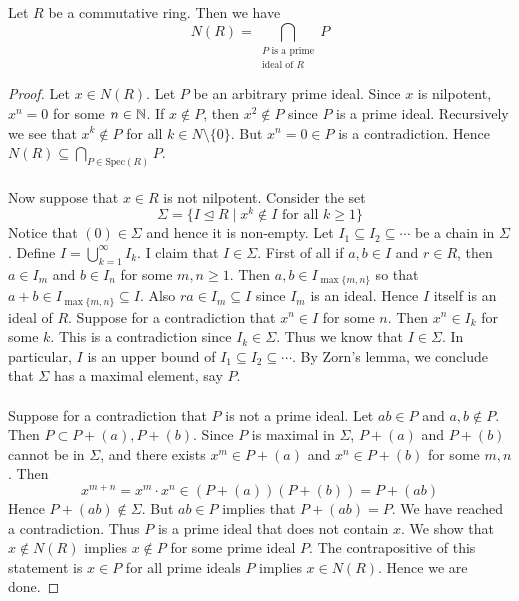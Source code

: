 \documentclass[a4paper]{article}
\begin{document}
\begin{prp}{}{} Let $R$ be a commutative ring. Then we have $$N(R)=\bigcap_{\substack{P\text{ is a prime}\\\text{ideal of }R}}P$$ \tcbline
\begin{proof}
Let $x\in N(R)$. Let $P$ be an arbitrary prime ideal. Since $x$ is nilpotent, $x^n=0$ for some $n\in\mathbb{N}$. If $x\notin P$, then $x^2\notin P$ since $P$ is a prime ideal. Recursively we see that $x^k\notin P$ for all $k\in N\setminus\{0\}$. But $x^n=0\in P$ is a contradiction. Hence $N(R)\subseteq\bigcap_{P\in\text{Spec}(R)}P$. \\~\\

Now suppose that $x\in R$ is not nilpotent. Consider the set $$\Sigma=\{I\trianglelefteq R\;|\;x^k\notin I\text{ for all }k\geq 1\}$$ Notice that $(0)\in\Sigma$ and hence it is non-empty. Let $I_1\subseteq I_2\subseteq\cdots$ be a chain in $\Sigma$. Define $I=\bigcup_{k=1}^\infty I_k$. I claim that $I\in\Sigma$. First of all if $a,b\in I$ and $r\in R$, then $a\in I_m$ and $b\in I_n$ for some $m,n\geq 1$. Then $a,b\in I_{\max\{m,n\}}$ so that $a+b\in I_{\max\{m,n\}}\subseteq I$. Also $ra\in I_m\subseteq I$ since $I_m$ is an ideal. Hence $I$ itself is an ideal of $R$. Suppose for a contradiction that $x^n\in I$ for some $n$. Then $x^n\in I_k$ for some $k$. This is a contradiction since $I_k\in\Sigma$. Thus we know that $I\in\Sigma$. In particular, $I$ is an upper bound of $I_1\subseteq I_2\subseteq\cdots$. By Zorn's lemma, we conclude that $\Sigma$ has a maximal element, say $P$. \\~\\

Suppose for a contradiction that $P$ is not a prime ideal. Let $ab\in P$ and $a,b\notin P$. Then $P\subset P+(a),P+(b)$. Since $P$ is maximal in $\Sigma$, $P+(a)$ and $P+(b)$ cannot be in $\Sigma$, and there exists $x^m\in P+(a)$ and $x^n\in P+(b)$ for some $m,n$. Then $$x^{m+n}=x^m\cdot x^n\in (P+(a))(P+(b))=P+(ab)$$ Hence $P+(ab)\notin\Sigma$. But $ab\in P$ implies that $P+(ab)=P$. We have reached a contradiction. Thus $P$ is a prime ideal that does not contain $x$. We show that $x\notin N(R)$ implies $x\notin P$ for some prime ideal $P$. The contrapositive of this statement is $x\in P$ for all prime ideals $P$ implies $x\in N(R)$. Hence we are done. 
\end{proof}
\end{prp}
\end{document}
